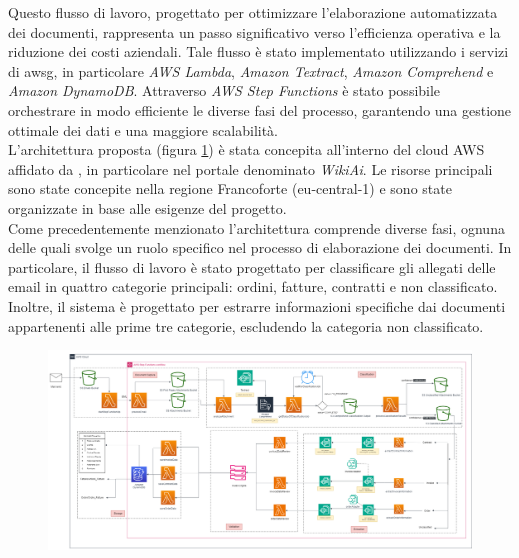 Questo flusso di lavoro, progettato per ottimizzare l'elaborazione automatizzata dei documenti, rappresenta un passo significativo verso l'efficienza operativa e la riduzione dei costi aziendali. Tale flusso è stato implementato utilizzando i servizi di \gls{awsg}, in particolare \emph{AWS Lambda}, \emph{Amazon Textract}, \emph{Amazon Comprehend} e \emph{Amazon DynamoDB}. Attraverso \emph{AWS Step Functions} è stato possibile orchestrare in modo efficiente le diverse fasi del processo, garantendo una gestione ottimale dei dati e una maggiore scalabilità.\\
L'architettura proposta (figura \ref{fig:architettura-alto-livello}) è stata concepita all'interno del cloud AWS affidato da \myCompany, in particolare nel portale denominato \emph{WikiAi}. Le risorse principali sono state concepite nella regione Francoforte (eu-central-1) e sono state organizzate in base alle esigenze del progetto. \\
Come precedentemente menzionato l'architettura comprende diverse fasi, ognuna delle quali svolge un ruolo specifico nel processo di elaborazione dei documenti. In particolare, il flusso di lavoro è stato progettato per classificare gli allegati delle email in quattro categorie principali: ordini, fatture, contratti e non classificato. Inoltre, il sistema è progettato per estrarre informazioni specifiche dai documenti appartenenti alle prime tre categorie, escludendo la categoria non classificato.

\begin{figure}[p]
    \centering
    \begin{turn}{-90}
      \includegraphics[width=\textheight]{img/design/classificatore_email.drawio.png}
    \end{turn}
    \label{fig:architettura-alto-livello}
\end{figure}

